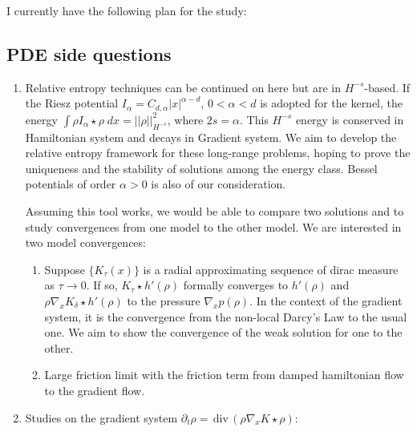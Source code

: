 \documentclass[a4paper,11pt]{article}
\def\div{\,\textrm{div}\,}
\begin{document}
I currently have the following plan for the study:
\vspace{-1em}
\subsection*{PDE side questions}
\begin{enumerate}\setlength\itemsep{5pt} \setlength{\parskip}{0pt}  \setlength{\parsep}{0pt}
 \item Relative entropy techniques can be continued on here but are in $H^{-s}$-based. If the Riesz potential $I_\alpha = C_{d,\alpha}|x|^{\alpha-d}$, $0<\alpha<d$ is adopted for the kernel, the energy $\int \rho I_\alpha\star\rho \;dx = ||\rho||_{H^{-s}}^2$, where $2s = \alpha$. This $H^{-s}$ energy is conserved in Hamiltonian system and decays in Gradient system. 
 We aim to develop the relative entropy framework for these long-range problems, hoping to prove the uniqueness and the stability of solutions among the energy class. Bessel potentials of order $\alpha>0$ is also of our consideration.
 
 Assuming this tool works, we would be able to compare two solutions and to study convergences from one model to the other model. We are interested in two model convergences:
 \begin{enumerate}
  \item Suppose $\{K_\tau(x)\}$ is a radial approximating sequence of dirac measure as $\tau \rightarrow 0$. If so, $K_\tau\star h'(\rho)$ formally converges to $h'(\rho)$ and $\rho\nabla_x K_\delta\star h'(\rho)$ to the pressure $\nabla_x p(\rho)$. In the context of the gradient system, it is the convergence from the non-local Darcy's Law to the usual one. We aim to show the convergence of the weak solution for one to the other. 
  \item Large friction limit with the friction term from damped hamiltonian flow to the gradient flow.
 \end{enumerate}
 \item Studies on the gradient system $\partial_t \rho = \div(\rho\nabla_x K\star\rho)$: 
 

\end{enumerate}
\end{document}
